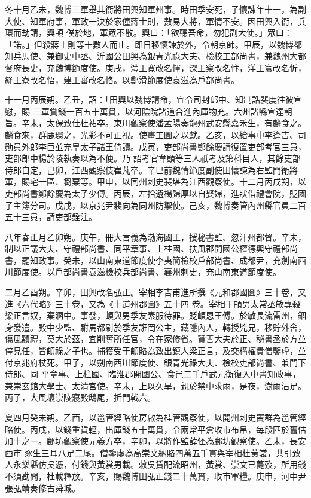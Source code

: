 \begin{pinyinscope}
 冬十月乙未，魏博三軍舉其衙將田興知軍州事。時田季安死，子懷諫年十一，為副大使、知軍府事，軍政一決於家僮蔣士則，數易大將，軍情不安。因田興入衙，兵環而劫請，興頓
 僕於地，軍眾不散。興曰：「欲聽吾命，勿犯副大使。」眾曰：「諾。」但殺蔣士則等十數人而止。即日移懷諫於外，令朝京師。甲辰，以魏博都知兵馬使、兼御史中丞、沂國公田興為銀青光祿大夫、檢校工部尚書，兼魏州大都督府長史，充魏博節度使。庚戌，澧王寬改名惲，深王察改名忭，洋王寰改名忻，絳王寮改名悟，建王審改名恪。以鄭滑節度使袁滋為戶部尚書。



 十一月丙辰朔。乙丑，詔：「田興以魏博請命，宜令司封郎中、知制誥裴度往彼宣慰，賜
 三軍賞錢一百五十萬貫，以河陰院諸道合進內庫物充。六州諸縣宣達朝旨。辛未，太保致仕杜祐卒。東川觀察使潘孟陽奏龍州武安縣嘉禾生，有麟食之。麟食來，群鹿環之，光彩不可正視。使畫工圖之以獻。乙亥，以給事中李逢吉、司勛員外郎李巨並充皇太子諸王侍讀。戊寅，吏部尚書鄭餘慶請復置吏部考官三員，吏部郎中楊於陵執奏以為不便。乃
 詔考官韋顗等三人祇考及第科目人，其餘吏部侍郎自定，己卯，江西觀察伎崔芃卒。辛巳前魏情節度副使田懷諫為右監門衛將軍，賜宅一區、芻粟等。甲申，以同州刺史裴堪為江西觀察使。十二月丙戌朔，以吏部尚書鄭餘慶為太子少傅。丙辰，左拾遺楊歸厚以自娶婦，進狀借禮會院，貶國子主簿分司。戊戌，以京兆尹裴向為同州防禦使。己亥，魏博奏管內州縣官員二百五十三員，請吏部銓注。



 八年春正月乙卯朔。庚午，冊大言義為渤海國王，授秘書監、忽汗州都督。辛未，制以正議大夫、守禮部尚書、同平章事、上柱國、扶風郡開國公權德輿守禮部尚書，罷知政事。癸未，以山南東道節度使李夷簡檢校戶部尚書、成都尹，充劍南西川節度使。以戶部尚書袁滋檢校兵部尚書、襄州刺史，充山南東道節度使。



 二月乙酉朔。辛卯，田興改名弘正。宰相李吉甫進所撰《元和郡國圖》三十卷，又進《六代略》三十卷，又為《十道州郡圖》五十四
 卷。宰相于頔男太常丞敏專殺梁正言奴，棄溷中。事發，頔與男季友素服待罪。貶頔恩王傅。於敏長流雷州，錮身發遣。殿中少監、駙馬都尉於季友誑罔公主，藏隱內人，轉授兇兄，移貯外舍，傷風黷禮，莫大於茲，宜削奪所任官，令在家修省。贊善大夫於正、秘書丞於方並停見任，皆頔祿之子也。捕獲受于頔賂為致出鎮人梁正言，及交構權貴僧鑒虛，並付京兆府杖死。甲子，以劍南西川節度使、銀青光祿大夫、檢校吏部尚書、兼門下侍郎、同
 平章事、上柱國、臨淮郡開國公、食邑二千戶武元衡復入中書知政事，兼崇玄館大學士、太清宮使。辛未，上以久旱，親於禁中求雨，是夜，澍雨沾足。丙子，大風壞崇陵寢殿鴟尾，折門戟六。



 夏四月癸未朔。乙酉，以邕管經略使房啟為桂管觀察使，以開州刺史竇群為邕管經略使。丙戌，以錢重貨輕，出庫錢五十萬貫，令兩常平倉收市布帛，每段匹於舊估加十之一。鄜坊觀察使元義方卒，辛卯，以將作監薛伾為鄜坊觀察使。乙未，長安西市
 豕生三耳八足二尾。僧鑒虛為高崇文納賂四萬五千貫與宰相杜黃裳，共引致人永樂縣仿吳憑，付錢與黃裳男載。敕吳賃配流昭州，黃裳、崇文已薨歿，所用錢不須勘問，杜載釋放。辛亥，賜魏博田弘正錢二十萬貫，收市軍糧。庚申，河中尹張弘靖奏修古舜城。




\end{pinyinscope}
